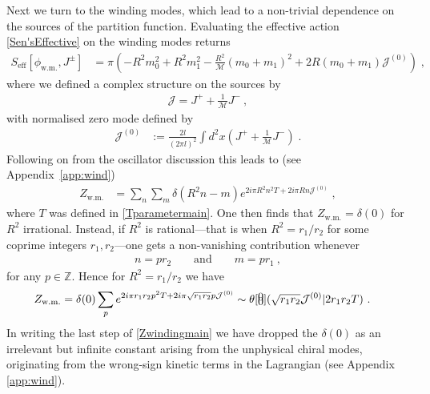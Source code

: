 \documentclass[11pt]{article}
\numberwithin{equation}{section}
\begin{document}
Next we turn to the winding modes, which lead to a non-trivial dependence on the sources of the partition function.
Evaluating the effective action \eqref{Sen'sEffective} on the winding modes returns
\begin{align}
S_{\text{eff}}[\phi_{\text{w.m.}},J^\pm]  &=  \pi \left(   -R^2m_0^2+R^2m_1^2 -  \frac{R^2}{{\mathcal M}}(m_0+m_1)^2 
+2R(m_0+m_1)\mathcal{J}^{(0)} \right)\;,
\end{align}
where we defined a complex structure on the sources by 
\begin{align}
    \mathcal{J} = J^{+} + \frac{1}{\mathcal{M}} J^{-}\ ,
\end{align}
with normalised zero mode defined by
\begin{align}\label{zeromain}
\mathcal{J}^{(0)}  & := \frac{2l}{(2  \pi l)^2  }\int d^2 x \left( J^+ + \frac{1}{\mathcal M} J^- \right)\;.
\end{align}
Following on from the oscillator discussion this leads to (see Appendix~\ref{app:wind})
\begin{align}\label{deltamain}
Z_{\text{w.m.}} &= \sum_{n} \sum_{m}\delta(R^2n-m) e^{2i\pi R^2n^2T +2i\pi R n\mathcal{J}^{(0)}}\;,
\end{align}
where $T$ was defined in \eqref{Tparametermain}. One then finds that 
$Z_{\text{w.m.}}= \delta(0)$ for $R^2$ irrational. Instead, if $R^2$ is rational---that is when $R^2 = {r_1}/{r_2}$ for some coprime integers $r_1, r_2$---one gets a non-vanishing contribution whenever
\begin{align}
n = p r_{2}\qquad\text{and}\qquad m=pr_1 \ ,
\end{align}
for any $p\in\mathbb{Z}$. Hence for $R^2 = {r_1}/{r_2}$ we have
\begin{align}\label{Zwindingmain}
Z_{\text{w.m.}}&= \delta(0) \sum_{p} e^{2i\pi r_1r_2 p^2 T +2i\pi \sqrt{r_1r_2} p\mathcal{J}^{(0)}}\sim\theta \! \begin{bmatrix} \vspace{-20pt} \\ 0  \\ \vspace{-20pt} \\ 0 \\ \vspace{-20pt} \end{bmatrix} \! ( \sqrt{r_1r_2}\mathcal{J}^{(0)} | 2r_1r_2T )\ .
\end{align}
In writing the last step of \eqref{Zwindingmain} we have dropped the $\delta(0)$ as an irrelevant but infinite constant arising from the unphysical chiral modes, originating from the wrong-sign kinetic terms in the Lagrangian (see Appendix \ref{app:wind}).
\end{document}
